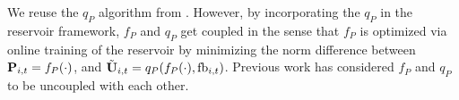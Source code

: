 \documentclass[conference]{IEEEtran}
\begin{document}
{%
We reuse the $q_P$ algorithm from \cite{Gupt1905:Predictive,6891198}.
However, by incorporating the $q_P$ in the reservoir framework, $f_P$ and $q_P$ get coupled in the sense that $f_P$ is optimized via online training of the reservoir by minimizing the norm difference between ${\bf P}_{i,t}=f_P(\cdot)$, and $\tilde{{\bf U}}_{i,t}=q_P(f_P(\cdot),\text{fb}_{i,t})$.
Previous work \cite{Gupt1905:Predictive,6891198} has considered $f_P$ and $q_P$ to be uncoupled with each other.

}
\end{document}
